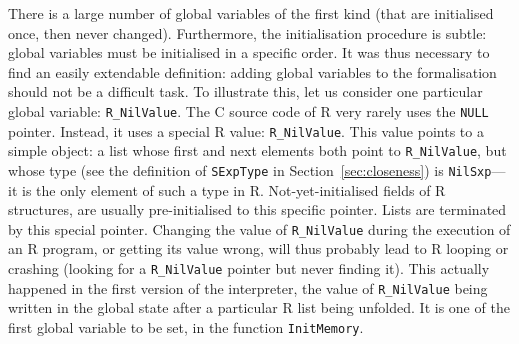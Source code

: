 \documentclass{article}
\newcommand\R{R}
\newcommand\Cn{C}
\begin{document}
There is a large number of global variables of the first kind
(that are initialised once, then never changed).
Furthermore, the initialisation procedure is subtle:
global variables must be initialised in a specific order.
It was thus necessary to find an easily extendable definition:
adding global variables to the formalisation should not be a difficult task.
To illustrate this, let us consider one particular
global variable: \texttt{R_NilValue}.
The \Cn{} source code of \R{} very rarely uses
the \texttt{NULL} pointer.
Instead, it uses a special \R{} value: \texttt{R_NilValue}.
This value points to a simple object:
a list whose first and next elements both point
to \texttt{R_NilValue},
but whose type
(see the definition of \texttt{SExpType} in Section~\ref{sec:closeness})
is \texttt{NilSxp}—%
it is the only element of such a type in \R{}.
%
Not-yet-initialised fields of \R{} structures,
are usually pre-initialised to this specific pointer.
Lists are terminated by this special pointer.
Changing the value of \texttt{R_NilValue}
during the execution of an \R{} program,
or getting its value wrong,
will thus probably lead to \R{} looping or crashing
(looking for a \texttt{R_NilValue} pointer but never finding it).
This actually happened in the first version of the interpreter,
the value of \texttt{R_NilValue} being written
in the global state after a particular \R{} list being unfolded.
It is one of the first global variable to be set,
in the function \texttt{InitMemory}.
\end{document}
